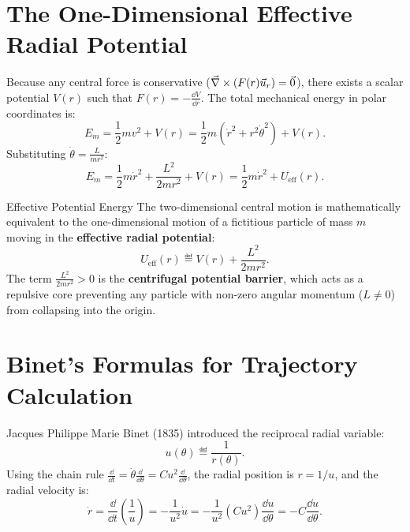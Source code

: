 \section{The One-Dimensional Effective Radial Potential}

Because any central force is conservative ($\vec{\nabla}\times(F(r)\vec{u}_r) = \vec{0}$), there exists a scalar potential $V(r)$ such that $F(r) = -\frac{\dd V}{\dd r}$.
The total mechanical energy in polar coordinates is:
\begin{equation}
E_m = \frac{1}{2}m v^2 + V(r) = \frac{1}{2}m(\dot{r}^2 + r^2\dot{\theta}^2) + V(r).
\end{equation}
Substituting $\dot{\theta} = \frac{L}{m r^2}$:
\begin{equation}
E_m = \frac{1}{2}m \dot{r}^2 + \frac{L^2}{2m r^2} + V(r) = \frac{1}{2}m \dot{r}^2 + U_{\text{eff}}(r).
\end{equation}

\begin{definitionbox}{Effective Potential Energy}
The two-dimensional central motion is mathematically equivalent to the one-dimensional motion of a fictitious particle of mass $m$ moving in the \textbf{effective radial potential}:
\begin{equation}
U_{\text{eff}}(r) \eqdef V(r) + \frac{L^2}{2m r^2}.
\end{equation}
The term $\frac{L^2}{2m r^2} > 0$ is the \textbf{centrifugal potential barrier}, which acts as a repulsive core preventing any particle with non-zero angular momentum ($L \neq 0$) from collapsing into the origin.
\end{definitionbox}

\section{Binet's Formulas for Trajectory Calculation}

Jacques Philippe Marie Binet (1835) introduced the reciprocal radial variable:
\begin{equation}
u(\theta) \eqdef \frac{1}{r(\theta)}.
\end{equation}
Using the chain rule $\frac{\dd}{\dd t} = \dot{\theta} \frac{\dd}{\dd\theta} = C u^2 \frac{\dd}{\dd\theta}$, the radial position is $r = 1/u$, and the radial velocity is:
\begin{equation}
\dot{r} = \frac{\dd}{\dd t}\left(\frac{1}{u}\right) = -\frac{1}{u^2}\dot{u} = -\frac{1}{u^2} (C u^2) \frac{\dd u}{\dd\theta} = -C \frac{\dd u}{\dd\theta}.
\end{equation}

